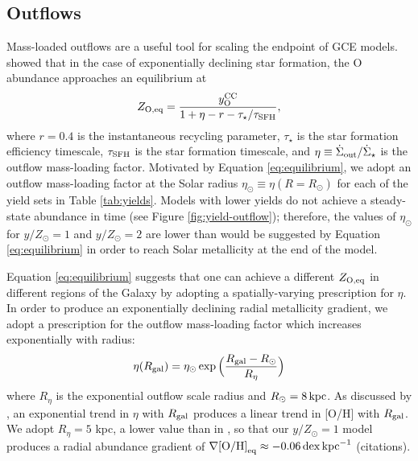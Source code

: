 \documentclass[twocolumn,twocolappendix,linenumbers]{aastex631}
\newcommand{\todo}[1]{{\color{red}#1}}
\newcommand{\mathOH}{{\rm [O/H]}}
\newcommand{\yZ}[1]{$y/Z_\odot=#1$}
\newcommand{\kpc}{\,{\rm kpc}}
\begin{document}
\subsection{Outflows}
\label{sec:outflows}

Mass-loaded outflows are a useful tool for scaling the endpoint of GCE models. \citet{weinberg_equilibrium_2017} showed that in the case of exponentially declining star formation, the O abundance approaches an equilibrium at
\begin{equation}
    \label{eq:equilibrium}
    Z_{\rm O,eq} = \frac{y_{\rm O}^{\rm CC}}{1 + \eta - r - \tau_\star/\tau_{\rm SFH}},
\end{equation}
where $r=0.4$ is the instantaneous recycling parameter, $\tau_\star$ is the star formation efficiency timescale, $\tau_{\rm SFH}$ is the star formation timescale, and $\eta\equiv \dot\Sigma_{\rm out}/\dot\Sigma_\star$ is the outflow mass-loading factor. 
Motivated by Equation \ref{eq:equilibrium}, we adopt an outflow mass-loading factor at the Solar radius $\eta_\odot\equiv\eta(R=R_\odot)$ for each of the yield sets in Table \ref{tab:yields}. Models with lower yields do not achieve a steady-state abundance in time (see Figure \ref{fig:yield-outflow}); therefore, the values of $\eta_\odot$ for \yZ{1} and \yZ{2} are lower than would be suggested by Equation \ref{eq:equilibrium} in order to reach Solar metallicity at the end of the model.

Equation \ref{eq:equilibrium} suggests that one can achieve a different $Z_{\rm O,eq}$ in different regions of the Galaxy by adopting a spatially-varying prescription for $\eta$. In order to produce an exponentially declining radial metallicity gradient, we adopt a prescription for the outflow mass-loading factor which increases exponentially with radius:
\begin{equation}
    \eta(R_{\rm gal}) = \eta_\odot \exp\Big(\frac{R_{\rm gal}-R_\odot}{R_\eta}\Big)
\end{equation}
where $R_\eta$ is the exponential outflow scale radius and $R_\odot=8\kpc$. As discussed by \citet{johnson_milky_2024}, an exponential trend in $\eta$ with $R_{\rm gal}$ produces a linear trend in [O/H] with $R_{\rm gal}$. We adopt $R_\eta=5$ kpc, a lower value than in \citet{johnson_milky_2024}, so that our $y/Z_\odot=1$ model produces a radial abundance gradient of $\nabla\mathOH_{\rm eq}\approx-0.06\,{\rm dex}\kpc^{-1}$ \todo{(citations)}.
\end{document}
